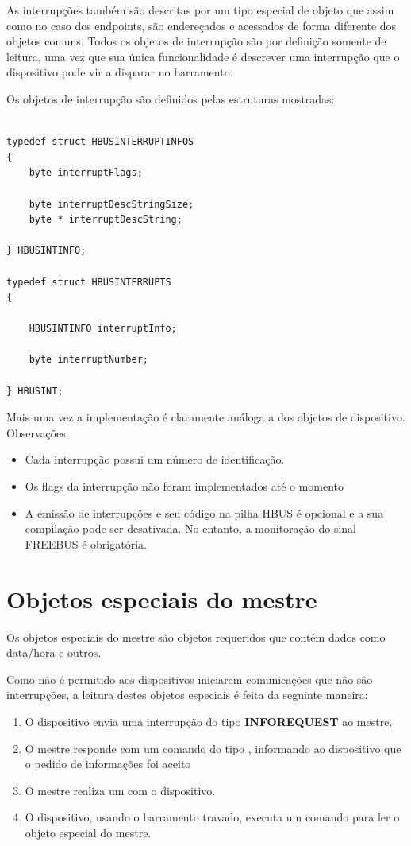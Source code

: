 \documentclass[11pt]{report}
\begin{document}
As interrupções também são descritas por um tipo especial de objeto que assim como no caso dos endpoints, são endereçados e acessados de forma diferente dos objetos comuns. Todos os objetos de interrupção são por definição somente de leitura, uma vez que sua única funcionalidade é descrever uma interrupção que o dispositivo pode vir a disparar no barramento.

Os objetos de interrupção são definidos pelas estruturas mostradas:

\begin{verbatim}

typedef struct HBUSINTERRUPTINFOS
{
	byte interruptFlags;
	
	byte interruptDescStringSize;
	byte * interruptDescString;
	
} HBUSINTINFO;

typedef struct HBUSINTERRUPTS
{
	
	HBUSINTINFO interruptInfo;
	
	byte interruptNumber;
	
} HBUSINT;

\end{verbatim}

Mais uma vez a implementação é claramente análoga a dos objetos de dispositivo. Observações:


\begin{itemize}

\item Cada interrupção possui um número de identificação.
\item Os flags da interrupção não foram implementados até o momento
\item A emissão de interrupções e seu código na pilha HBUS é opcional e a sua compilação pode ser desativada. No entanto, a monitoração do sinal FREEBUS é obrigatória.

\end{itemize}

\section{Objetos especiais do mestre}

Os objetos especiais do mestre são objetos requeridos que contém dados como data/hora e outros.

Como não é permitido aos dispositivos iniciarem comunicações que não são interrupções, a leitura destes objetos especiais é feita da seguinte maneira:

\begin{enumerate}
\item O dispositivo envia uma interrupção do tipo \textbf{INFOREQUEST} ao mestre.
\item O mestre responde com um comando do tipo , informando ao dispositivo que o pedido de informações foi aceito
\item O mestre realiza um  com o dispositivo.
\item O dispositivo, usando o barramento travado, executa um comando  para ler o objeto especial do mestre.
\end{enumerate}
\end{document}
